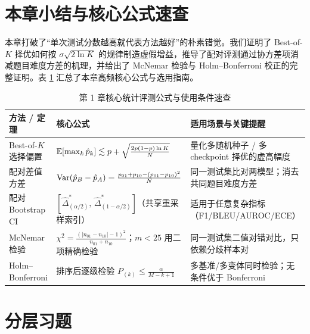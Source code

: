 \section{本章小结与核心公式速查}

本章打破了“单次测试分数越高就代表方法越好”的朴素错觉。我们证明了 Best-of-$K$ 择优如何按 $\sigma\sqrt{2\ln K}$ 的规律制造虚假增益，推导了配对评测通过协方差项消减题目难度方差的机理，并给出了 McNemar 检验与 Holm--Bonferroni 校正的完整证明。表 \ref{tab:ch1-summary} 汇总了本章高频核心公式与选用指南。

\begin{table}[htbp]
  \centering
  \caption{第 1 章核心统计评测公式与使用条件速查}
  \label{tab:ch1-summary}
  \footnotesize
  \begin{tabularx}{\linewidth}{@{}p{34mm}p{58mm}X@{}}
    \toprule
    \textbf{方法 / 定理} & \textbf{核心公式} & \textbf{适用场景与关键提醒} \\
    \midrule
    Best-of-$K$ 选择偏置 & $\mathbb{E}[\max_k \hat{p}_k] \lesssim p + \sqrt{\frac{2p(1-p)\ln K}{N}}$ & 量化多随机种子 / 多 checkpoint 择优的虚高幅度 \\
    配对差值方差 & $\operatorname{Var}(\hat{p}_B-\hat{p}_A) = \frac{p_{01}+p_{10}-(p_{01}-p_{10})^2}{N}$ & 同一测试集比对两模型；消去共同题目难度方差 \\
    配对 Bootstrap CI & $[\hat{\Delta}^{*}_{(\alpha/2)},\, \hat{\Delta}^{*}_{(1-\alpha/2)}]$（共享重采样索引） & 适用于任意复杂指标（F1/BLEU/AUROC/ECE） \\
    McNemar 检验 & $\chi^2 = \frac{(|n_{01}-n_{10}|-1)^2}{n_{01}+n_{10}}$；$m<25$ 用二项精确检验 & 同一测试集二值对错对比，只依赖分歧样本对 \\
    Holm--Bonferroni & 排序后逐级检验 $P_{(k)} \le \frac{\alpha}{M-k+1}$ & 多基准/多变体同时检验；无条件优于 Bonferroni \\
    \bottomrule
  \end{tabularx}
\end{table}

\section{分层习题}


